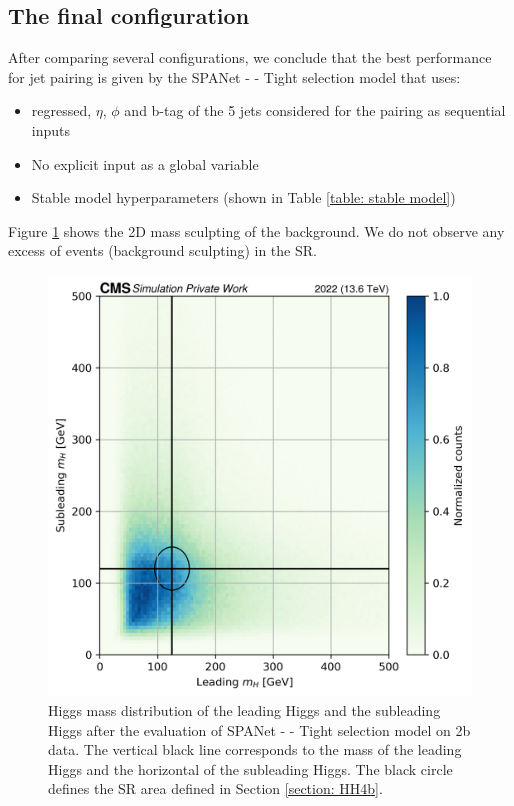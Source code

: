 \subsection{The final configuration} \label{subsection: Optimal config}
After comparing several configurations, we conclude that the best performance for jet pairing is given by the SPANet - \kl - Tight selection model that uses:
\begin{itemize}
    \item \pt regressed, $\eta$, $\phi$ and b-tag of the 5 jets considered for the pairing as sequential inputs
    \item No explicit \kl input as a global variable
    \item Stable model hyperparameters (shown in Table \ref{table: stable model})
\end{itemize}
Figure \ref{fig: 2D mass dist kl} shows the 2D mass sculpting of the background. We do not observe any excess of events (background sculpting) in the SR.

\begin{figure}
    \centering
    \includegraphics[width=0.6\linewidth]{Images/6.Improving/kappa lambda/mass dist best model.png}
    \caption{Higgs mass distribution of the leading Higgs and the subleading Higgs after the evaluation of  SPANet - \kl - Tight selection model on 2b data. The vertical black line corresponds to the mass of the leading Higgs and the horizontal of the subleading Higgs. The black circle defines the SR area defined in Section \ref{section: HH4b}.}
    \label{fig: 2D mass dist kl}
\end{figure}


